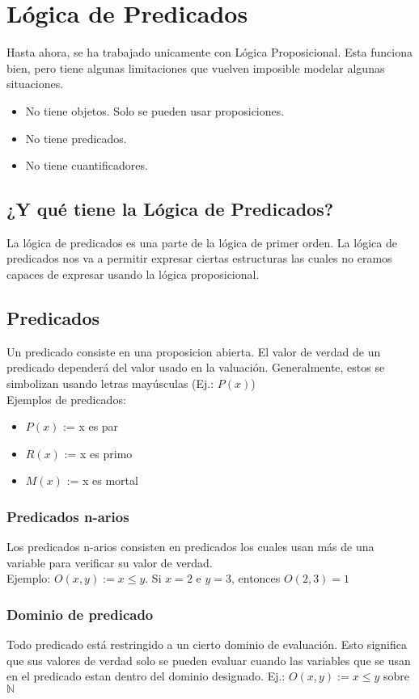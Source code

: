 \documentclass{article}
\begin{document}
\section{Lógica de Predicados}
Hasta ahora, se ha trabajado unicamente con Lógica Proposicional. Esta funciona bien, pero tiene algunas limitaciones que vuelven imposible modelar algunas situaciones.
\begin{itemize}
    \item No tiene objetos. Solo se pueden usar proposiciones.
    \item No tiene predicados.
    \item No tiene cuantificadores.
\end{itemize}

\subsection{¿Y qué tiene la Lógica de Predicados?}
La lógica de predicados es una parte de la lógica de primer orden. La lógica de predicados nos va a permitir expresar ciertas estructuras las cuales no eramos capaces de expresar usando la lógica proposicional.

\subsection{Predicados}
Un predicado consiste en una proposicion abierta. El valor de verdad de un predicado dependerá del valor usado en la valuación. Generalmente, estos se simbolizan usando letras mayúsculas (Ej.: $P(x)$)\\
Ejemplos de predicados:
\begin{itemize}
    \item $P(x)$ := x es par
    \item $R(x)$ := x es primo
    \item $M(x)$ := x es mortal
\end{itemize}

\subsubsection{Predicados n-arios}
Los predicados n-arios consisten en predicados los cuales usan más de una variable para verificar su valor de verdad.\\
Ejemplo: $O(x,y) := x \leq y $. Si $x = 2$ e $y = 3$, entonces $O(2,3) = 1$

\subsubsection{Dominio de predicado}
Todo predicado está restringido a un cierto dominio de evaluación. Esto significa que sus valores de verdad solo se pueden evaluar cuando las variables que se usan en el predicado estan dentro del dominio designado.
Ej.: $O(x,y) := x \leq{} y$ sobre $\mathds{N}$
\end{document}
